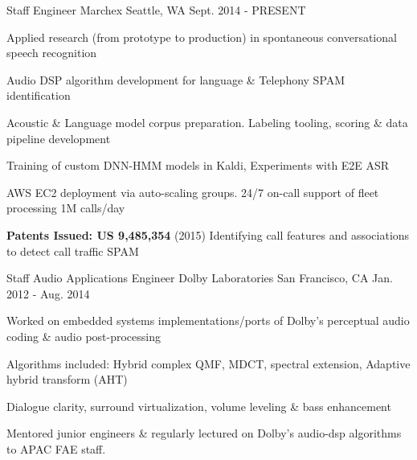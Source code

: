 

\begin{cventries}

  \cventry
    {Staff Engineer} %
    {Marchex} %
    {Seattle, WA} %
    {Sept. 2014 - PRESENT} %
    {
      \begin{cvitems} %
        \item {Applied research (from prototype to production) in spontaneous conversational speech recognition}
        \item {Audio DSP algorithm development for language \& Telephony SPAM identification}
        \item {Acoustic \& Language model corpus preparation. Labeling tooling, scoring \& data pipeline development}
        \item {Training of custom DNN-HMM models in Kaldi, Experiments with E2E ASR}
        \item {AWS EC2 deployment via auto-scaling groups. 24/7 on-call support of fleet processing 1M calls/day}
        \item \textbf{Patents Issued: US 9,485,354} (2015) Identifying call features and associations to detect call traffic SPAM
      \end{cvitems}
    }

  \cventry
    {Staff Audio Applications Engineer} %
    {Dolby Laboratories} %
    {San Francisco, CA} %
    {Jan. 2012 - Aug. 2014} %
    {
      \begin{cvitems} %
        \item {Worked on embedded systems implementations/ports of Dolby's perceptual audio coding \& audio post-processing}
        \item {Algorithms included: Hybrid complex QMF, MDCT, spectral extension, Adaptive hybrid transform (AHT)}
        \item {Dialogue clarity, surround virtualization, volume leveling \& bass enhancement}
        \item {Mentored junior engineers \& regularly lectured on Dolby's audio-dsp algorithms to APAC FAE staff.}
      \end{cvitems}
    }


\end{cventries}

